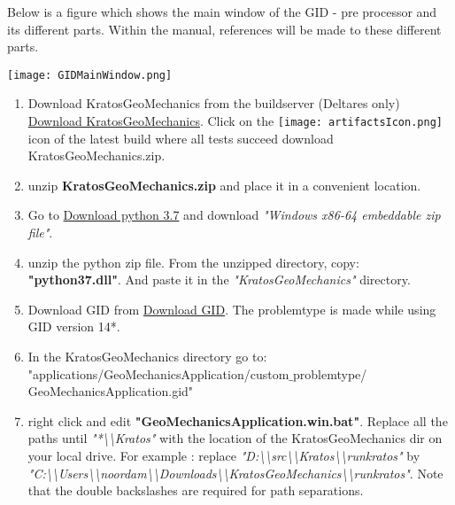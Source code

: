Below is a figure which shows the main window of the GID - pre processor and its different parts. Within the manual, references will be made to these different parts.

\texttt{[image: GIDMainWindow.png]} 



\begin{enumerate}
	\setlength\itemsep{2mm}
	
	\item Download KratosGeoMechanics from the buildserver (Deltares only) \href{https://build.deltares.nl/viewType.html?buildTypeId=GEOFEA_KratosGeo_Compile}{Download KratosGeoMechanics}. Click on the \texttt{[image: artifactsIcon.png]} icon of the latest build where all tests succeed download KratosGeoMechanics.zip.
	
	\item unzip \textbf{KratosGeoMechanics.zip} and place it in a convenient location.
	
	\item Go to \href{https://www.python.org/downloads/release/python-375/} {Download python 3.7} and download \textit{"Windows x86-64 embeddable zip file"}.
	
	\item unzip the python zip file. From the unzipped directory, copy: \textbf{"python37.dll"}. And paste it in the \textit{"KratosGeoMechanics"} directory.
	
	\item Download GID from \href{https://www.gidhome.com/download/official-versions/}{Download GID}. The problemtype is made while using GID version 14*. 
	
	\item In the KratosGeoMechanics directory go to: \newline "applications/GeoMechanicsApplication/custom$\_$problemtype/ \newline GeoMechanicsApplication.gid"
	
	\item right click and edit \textbf{"GeoMechanicsApplication.win.bat"}. Replace all the paths until \textit{"*\textbackslash\textbackslash Kratos"} with the location of the KratosGeoMechanics dir on your local drive. For example :
	replace \textit{"D:\textbackslash\textbackslash src\textbackslash\textbackslash Kratos\textbackslash\textbackslash runkratos"} by \newline \textit{"C:\textbackslash\textbackslash Users\textbackslash\textbackslash noordam\textbackslash\textbackslash Downloads\textbackslash\textbackslash KratosGeoMechanics\textbackslash\textbackslash runkratos"}. Note that the double backslashes are required for path separations.
		

\end{enumerate}
